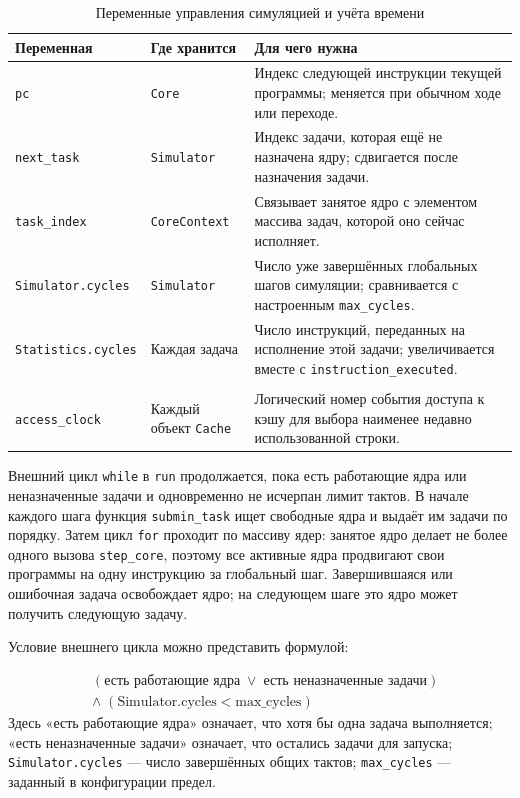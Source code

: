 \documentclass[12pt,a4paper]{article}
\begin{document}
\begin{table}[H]
    \centering
    \caption{Переменные управления симуляцией и учёта времени}
    \label{tab:simulation-counters}
    \begin{tabular}{|p{3.4cm}|p{4.1cm}|p{6.2cm}|}
        \hline
        \textbf{Переменная} & \textbf{Где хранится} & \textbf{Для чего нужна} \\
        \hline
        \texttt{pc} & \texttt{Core} & Индекс следующей инструкции текущей программы; меняется при обычном ходе или переходе. \\
        \hline
        \texttt{next\_task} & \texttt{Simulator} & Индекс задачи, которая ещё не назначена ядру; сдвигается после назначения задачи. \\
        \hline
        \texttt{task\_index} & \texttt{CoreContext} & Связывает занятое ядро с элементом массива задач, которой оно сейчас исполняет. \\
        \hline
        {\small\texttt{Simulator.cycles}} & \texttt{Simulator} & Число уже завершённых глобальных шагов симуляции; сравнивается с настроенным \texttt{max\_cycles}. \\
        \hline
        {\small\texttt{Statistics.cycles}} & Каждая задача & Число инструкций, переданных на исполнение этой задачи; увеличивается вместе с \texttt{instruction\_executed}. \\
        \hline
        {\small\shortstack[l]{\texttt{Cache.}\\\texttt{access\_clock}}} & Каждый объект \texttt{Cache} & Логический номер события доступа к кэшу для выбора наименее недавно использованной строки. \\
        \hline
    \end{tabular}
\end{table}

Внешний цикл \texttt{while} в \texttt{run} продолжается, пока есть работающие ядра или неназначенные задачи и одновременно не исчерпан лимит тактов. В начале каждого шага функция \texttt{submin\_task} ищет свободные ядра и выдаёт им задачи по порядку. Затем цикл \texttt{for} проходит по массиву ядер: занятое ядро делает не более одного вызова \texttt{step\_core}, поэтому все активные ядра продвигают свои программы на одну инструкцию за глобальный шаг. Завершившаяся или ошибочная задача освобождает ядро; на следующем шаге это ядро может получить следующую задачу.

Условие внешнего цикла можно представить формулой:

\begin{equation}
    \boxed{\begin{aligned}
        &(\text{есть работающие ядра} \;\lor\; \text{есть неназначенные задачи})\\
        &\land\; (\text{Simulator.cycles} < \text{max\_cycles})
    \end{aligned}}
\end{equation}
Здесь «есть работающие ядра» означает, что хотя бы одна задача выполняется; «есть неназначенные задачи» означает, что остались задачи для запуска; \texttt{Simulator.cycles} --- число завершённых общих тактов; \texttt{max\_cycles} --- заданный в конфигурации предел.
\end{document}
